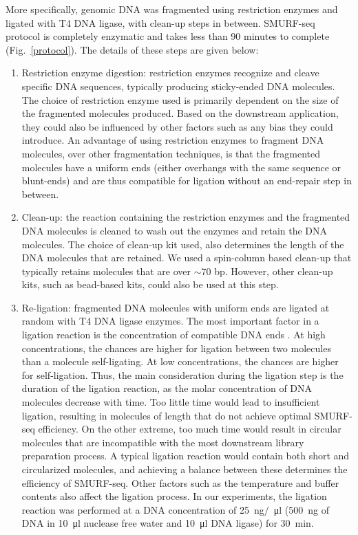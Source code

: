 More specifically, genomic DNA was fragmented using restriction enzymes
and ligated with T4 DNA ligase, with clean-up steps in between.
SMURF-seq protocol is completely enzymatic and takes less than 90
minutes to complete (Fig.~\ref{protocol}).  The details of these steps
are given below:
\begin{enumerate}
\item Restriction enzyme digestion: restriction enzymes recognize
  and cleave specific DNA sequences, typically producing sticky-ended DNA
  molecules.
  The choice of restriction enzyme used is primarily dependent on the
  size of the fragmented molecules produced. Based on the downstream
  application, they could also be influenced by other factors such as any
  bias they could introduce.
  An advantage of using restriction enzymes to fragment DNA molecules,
  over other fragmentation techniques, is that the fragmented molecules
  have a uniform ends (either overhangs with the same sequence or
  blunt-ends) and are thus compatible for ligation without an end-repair
  step in between.

\item Clean-up: the reaction containing the restriction
  enzymes and the fragmented DNA molecules is cleaned to wash out the
  enzymes and retain the DNA molecules. The choice of clean-up kit used, also
  determines the length of the DNA molecules that are retained. We used a
  spin-column based clean-up that typically retains molecules that are over
  $\sim$70 bp. However, other clean-up kits, such as bead-based kits,
  could also be used at this step.

\item Re-ligation: fragmented DNA molecules with uniform ends are
  ligated at random with T4 DNA ligase enzymes.
  The most important factor in a ligation reaction is the
  concentration of compatible DNA ends \citep{dugaiczyk1975ligation}. At
  high concentrations, the chances are higher for ligation between two
  molecules than a molecule self-ligating. At low concentrations, the
  chances are higher for self-ligation.
  Thus, the main consideration during the ligation step is the
  duration of the ligation reaction, as the molar concentration of DNA
  molecules decrease with time. Too little time would lead to insufficient
  ligation, resulting in molecules of length that do not achieve optimal
  SMURF-seq efficiency. On the other extreme, too much time would result
  in circular molecules that are incompatible with the most downstream
  library preparation process. A typical ligation reaction would contain
  both short and circularized molecules, and achieving a balance between
  these determines the efficiency of SMURF-seq.
  Other factors such as the temperature and buffer contents also affect
  the ligation process.
  In our experiments, the ligation reaction was performed at a DNA
  concentration of \SI{25}{\nano\gram}$/$\SI{}{\micro\litre}
  (\SI{500}{\nano\gram} of DNA in \SI{10}{\micro\litre} nuclease free
  water and \SI{10}{\micro\litre} DNA ligase) for \SI{30}{\minute}.


\end{enumerate}
